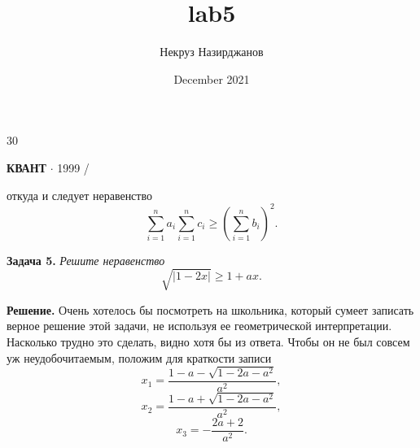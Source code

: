 \documentclass{article}
\title{lab5}
\author{Некруз Назирджанов}
\date{December 2021}
\begin{document}
\begin{minipage}[b]{0.33333\textwidth}
\raggedright
{\large 30}
\end{minipage}%
\begin{minipage}[b]{0.33333\textwidth}
\centering
\textbf{КВАНТ} $\cdot$ \textsf{1999 \slash {}}
\end{minipage}%

\begin{multicols}{3}
откуда и следует неравенство \\
\[\sum_{i=1}^{n} a_i \sum_{i=1}^{n} c_i \geq (\sum_{i=1}^{n} b_i)^2.\] \par
\textbf{Задача 5.} \textsl{Решите неравенство}
\[\sqrt{|1 - 2x|} \geq 1 + ax.\] \par
\textbf{Решение.}  Очень хотелось бы посмотреть на школьника,
который сумеет записать верное решение этой задачи,
не используя ее геометрической интерпретации. Насколько
трудно это сделать, видно хотя бы из ответа. Чтобы он не
был совсем уж неудобочитаемым, положим для краткости записи\\
\[x_1 = \frac{1 - a - \sqrt{1 - 2a - a^2}}{a^2},\]
\[x_2 = \frac{1 - a + \sqrt{1 - 2a - a^2}}{a^2},\]
\[x_3 = -\frac{2a + 2}{a^2}.\]


\end{multicols}
\end{document}

